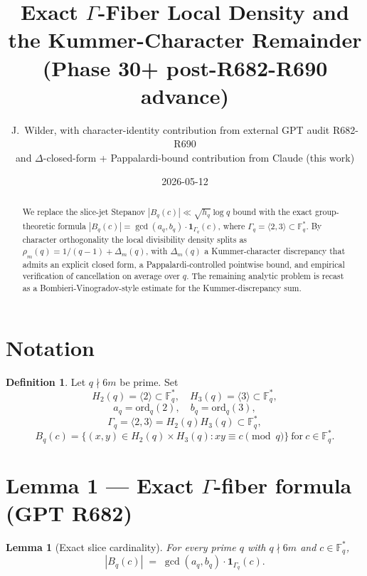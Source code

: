 \documentclass[12pt]{amsart}
\title{Exact $\Gamma$-Fiber Local Density and the Kummer-Character Remainder\\
{\small (Phase 30+ post-R682-R690 advance)}}
\author{J.\ Wilder, with character-identity contribution from external GPT audit R682-R690\\
and $\Delta$-closed-form + Pappalardi-bound contribution from Claude (this work)}
\date{2026-05-12}
\newtheorem{lemma}{Lemma}
\theoremstyle{definition}
\newtheorem{definition}{Definition}
\theoremstyle{remark}
\begin{document}
\maketitle

\begin{abstract}
We replace the slice-jet Stepanov $|B_q(c)| \ll \sqrt{h_q}\log q$ bound with the exact
group-theoretic formula $|B_q(c)| = \gcd(a_q, b_q) \cdot \mathbf{1}_{\Gamma_q}(c)$,
where $\Gamma_q = \langle 2, 3 \rangle \subset \mathbb{F}_q^*$. By character orthogonality
the local divisibility density splits as $\rho_m(q) = 1/(q-1) + \Delta_m(q)$, with
$\Delta_m(q)$ a Kummer-character discrepancy that admits an explicit closed form,
a Pappalardi-controlled pointwise bound, and empirical verification of cancellation
on average over $q$. The remaining analytic problem is recast as a
Bombieri-Vinogradov-style estimate for the Kummer-discrepancy sum.
\end{abstract}

\section{Notation}

\begin{definition}
Let $q \nmid 6m$ be prime. Set
$$
H_2(q) = \langle 2 \rangle \subset \mathbb{F}_q^*, \quad H_3(q) = \langle 3 \rangle \subset \mathbb{F}_q^*,
$$
$$
a_q = \mathrm{ord}_q(2), \quad b_q = \mathrm{ord}_q(3),
$$
$$
\Gamma_q = \langle 2, 3 \rangle = H_2(q) H_3(q) \subset \mathbb{F}_q^*,
$$
$$
B_q(c) = \{(x, y) \in H_2(q) \times H_3(q) : x y \equiv c \pmod q\}\ \text{for}\ c \in \mathbb{F}_q^*.
$$
\end{definition}

\section{Lemma 1 --- Exact $\Gamma$-fiber formula (GPT R682)}

\begin{lemma}[Exact slice cardinality]\label{lem:R682}
For every prime $q$ with $q \nmid 6m$ and $c \in \mathbb{F}_q^*$,
$$
|B_q(c)|
\;=\;
\gcd(a_q, b_q) \cdot \mathbf{1}_{\Gamma_q}(c).
$$
\end{lemma}
\end{document}
